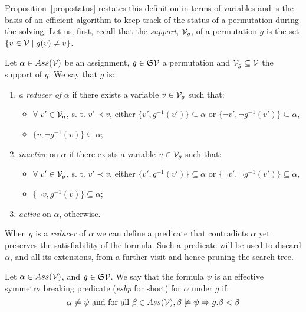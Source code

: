 Proposition~\ref{prop:status} restates this definition in terms of variables
and is the basis of an efficient algorithm to keep track of the status of a
permutation during the solving. Let us, first, recall that the \emph{support},
$\mathcal{V}_g$, of a permutation $g$ is the set $\{ v \in \mathcal{V} \mid g(v) \neq v\}$.

\begin{proposition}
	\label{prop:status}
	Let $\alpha \in Ass(\mathcal{V})$ be an assignment, $g \in \mathfrak{S}{\mathcal{V}}$ a permutation and $ \mathcal{V}_g \subseteq  \mathcal{V}$ the support of $g$. We say that $g$ is:
	\begin{enumerate}
		\item  \emph{a reducer of} $\alpha$  if there exists a variable $v \in \mathcal{V}_g$
		such that:
		\begin{itemize}
			\item $\forall\ v' \in \mathcal{V}_g$, s. t. $v' \prec v$, either $\{v', g^{-1}(v')\}\subseteq\alpha $ or $\{\neg v', \neg g^{-1}(v')\} \subseteq \alpha $,
			\item $\{v, \neg g^{-1}(v)\} \subseteq \alpha$;
		\end{itemize}
		\item  \emph{inactive} on $\alpha$  if there exists a variable $v \in \mathcal{V}_g$
		such that:
		\begin{itemize}
			\item $\forall\ v' \in \mathcal{V}_g$, s. t. $v' \prec v$, either $\{v', g^{-1}(v')\}\subseteq\alpha $ or $\{\neg v', \neg g^{-1}(v')\} \subseteq \alpha $,
			\item $\{\neg v, g^{-1}(v)\} \subseteq \alpha$;
		\end{itemize}
		\item  \emph{active} on $\alpha$, otherwise.
	\end{enumerate}
\end{proposition}

When $g$ is a \textit{reducer} of $\alpha$ we can define a predicate that contradicts $\alpha$ yet preserves the satisfiability of the formula. Such a predicate will be used to discard $\alpha$, and all its extensions, from a further visit and hence pruning the search tree.

\begin{definition}
	\label{def:esbp}
	Let $\alpha \in Ass(\mathcal{V})$, and $g \in \mathfrak{S}{\mathcal{V}}$.
	We say that the formula $\psi$ is an effective symmetry breaking predicate (\textit{esbp} for short) for $\alpha$ under $g$ if:
	$$\alpha \not\models \psi \text{ and for all }\beta \in Ass(\mathcal{V}), \beta \not\models \psi \Rightarrow g.\beta < \beta$$
\end{definition}

